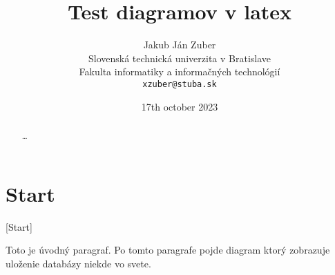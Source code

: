\documentclass[10pt,twoside,slovak,a4paper]{article}
\title{Test diagramov v latex} %
\author{Jakub Ján Zuber\\[2pt]
	{\small Slovenská technická univerzita v Bratislave}\\
	{\small Fakulta informatiky a informačných technológií}\\
	{\small \texttt{xzuber@stuba.sk}}
	}
\date{\small 17th october 2023} %
\begin{document}
\maketitle

\begin{abstract}
\ldots
\end{abstract}

\section{Start}[Start]

Toto je úvodný paragraf. Po tomto paragrafe pojde diagram ktorý zobrazuje uloženie databázy niekde vo svete.
\end{document}
